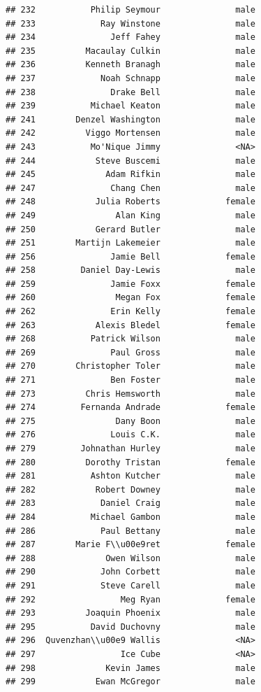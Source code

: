 \documentclass[
]{article}
\begin{document}
\begin{verbatim}
## 232           Philip Seymour               male
## 233             Ray Winstone               male
## 234               Jeff Fahey               male
## 235          Macaulay Culkin               male
## 236          Kenneth Branagh               male
## 237             Noah Schnapp               male
## 238               Drake Bell               male
## 239           Michael Keaton               male
## 241        Denzel Washington               male
## 242          Viggo Mortensen               male
## 243           Mo'Nique Jimmy               <NA>
## 244            Steve Buscemi               male
## 245              Adam Rifkin               male
## 247               Chang Chen               male
## 248            Julia Roberts             female
## 249                Alan King               male
## 250            Gerard Butler               male
## 251        Martijn Lakemeier               male
## 256               Jamie Bell             female
## 258         Daniel Day-Lewis               male
## 259               Jamie Foxx             female
## 260                Megan Fox             female
## 262               Erin Kelly             female
## 263            Alexis Bledel             female
## 268           Patrick Wilson               male
## 269               Paul Gross               male
## 270        Christopher Toler               male
## 271               Ben Foster               male
## 273          Chris Hemsworth               male
## 274         Fernanda Andrade             female
## 275                Dany Boon               male
## 276               Louis C.K.               male
## 279         Johnathan Hurley               male
## 280          Dorothy Tristan             female
## 281           Ashton Kutcher               male
## 282            Robert Downey               male
## 283             Daniel Craig               male
## 284           Michael Gambon               male
## 286             Paul Bettany               male
## 287        Marie F\\u00e9ret             female
## 288              Owen Wilson               male
## 290             John Corbett               male
## 291             Steve Carell               male
## 292                 Meg Ryan             female
## 293          Joaquin Phoenix               male
## 295           David Duchovny               male
## 296  Quvenzhan\\u00e9 Wallis               <NA>
## 297                 Ice Cube               <NA>
## 298              Kevin James               male
## 299            Ewan McGregor               male

\end{verbatim}
\end{document}
